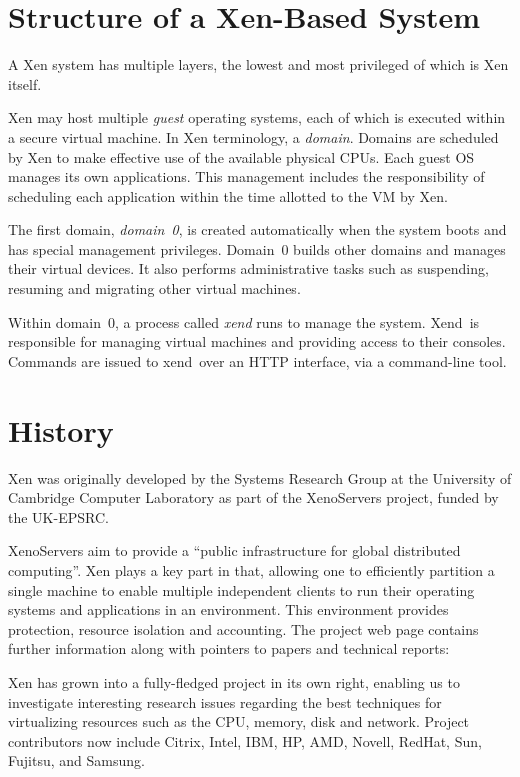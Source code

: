 \documentclass[11pt,twoside,final,openright]{report}
\def\Xend{{Xend}\xspace}
\def\xend{{xend}\xspace}
\begin{document}
\section{Structure of a Xen-Based System}

A Xen system has multiple layers, the lowest and most privileged of
which is Xen itself.

Xen may host multiple \emph{guest} operating systems, each of which is
executed within a secure virtual machine. In Xen terminology, a
\emph{domain}. Domains are scheduled by Xen to make effective use of the
available physical CPUs. Each guest OS manages its own applications.
This management includes the responsibility of scheduling each
application within the time allotted to the VM by Xen.

The first domain, \emph{domain~0}, is created automatically when the
system boots and has special management privileges. Domain~0 builds
other domains and manages their virtual devices. It also performs
administrative tasks such as suspending, resuming and migrating other
virtual machines.

Within domain~0, a process called \emph{xend} runs to manage the system.
\Xend\ is responsible for managing virtual machines and providing access
to their consoles. Commands are issued to \xend\ over an HTTP interface,
via a command-line tool.


\section{History}

Xen was originally developed by the Systems Research Group at the
University of Cambridge Computer Laboratory as part of the XenoServers
project, funded by the UK-EPSRC\@.

XenoServers aim to provide a ``public infrastructure for global
distributed computing''. Xen plays a key part in that, allowing one to
efficiently partition a single machine to enable multiple independent
clients to run their operating systems and applications in an
environment. This environment provides protection, resource isolation
and accounting. The project web page contains further information along
with pointers to papers and technical reports:

Xen has grown into a fully-fledged project in its own right, enabling us
to investigate interesting research issues regarding the best techniques
for virtualizing resources such as the CPU, memory, disk and network.
Project contributors now include Citrix, Intel, IBM, HP, AMD, Novell,
RedHat, Sun, Fujitsu, and Samsung.
\end{document}
